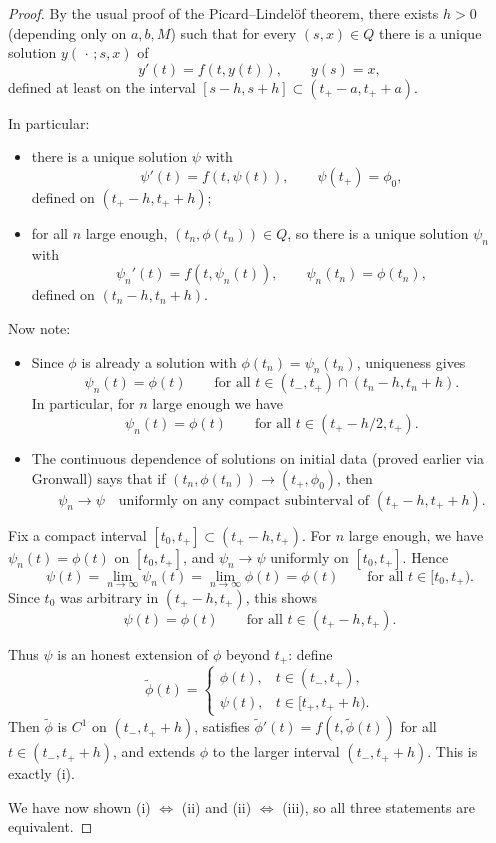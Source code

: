 \documentclass{tufte-handout}
\theoremstyle{definition}
\begin{document}
\begin{proof}
	By the usual proof of the Picard–Lindelöf theorem, there exists $h>0$ (depending
	only on $a,b,M$) such that for every $(s,x) \in Q$ there is a unique solution
	$y(\,\cdot\,;s,x)$ of
	\[
		y'(t) = f(t,y(t)), \qquad y(s) = x,
	\]
	defined at least on the interval $[s-h,s+h] \subset (t_+ - a, t_+ + a)$.

	In particular:
	\begin{itemize}
		\item there is a unique solution $\psi$ with
		      \[
		      	\psi'(t) = f(t,\psi(t)), \qquad \psi(t_+) = \phi_0,
		      \]
		      defined on $(t_+ - h,t_+ + h)$;
		\item for all $n$ large enough, $(t_n,\phi(t_n)) \in Q$,
		      so there is a unique solution $\psi_n$ with
		      \[
		      	\psi_n'(t) = f(t,\psi_n(t)), \qquad \psi_n(t_n) = \phi(t_n),
		      \]
		      defined on $(t_n - h,t_n + h)$.
	\end{itemize}

	Now note:
	\begin{itemize}
		\item Since $\phi$ is already a solution with $\phi(t_n) = \psi_n(t_n)$,
		      uniqueness gives
		      \[
		      	\psi_n(t) = \phi(t)
		      	\qquad\text{for all } t \in (t_-,t_+) \cap (t_n - h,t_n + h).
		      \]
		      In particular, for $n$ large enough we have
		      \[
		      	\psi_n(t) = \phi(t)
		      	\qquad\text{for all } t \in (t_+ - h/2, t_+).
		      \]
		\item The continuous dependence of solutions on initial data
		      (proved earlier via Gronwall) says that if
		      $(t_n,\phi(t_n)) \to (t_+,\phi_0)$, then
		      \[
		      	\psi_n \to \psi
		      	\quad\text{uniformly on any compact subinterval of } (t_+ - h,t_+ + h).
		      \]
	\end{itemize}

	Fix a compact interval $[t_0,t_+] \subset (t_+ - h,t_+)$.
	For $n$ large enough, we have $\psi_n(t) = \phi(t)$ on $[t_0,t_+]$, and
	$\psi_n \to \psi$ uniformly on $[t_0,t_+]$. Hence
	\[
		\psi(t) = \lim_{n\to\infty} \psi_n(t)
		= \lim_{n\to\infty} \phi(t)
		= \phi(t)
		\qquad\text{for all } t \in [t_0,t_+).
	\]
	Since $t_0$ was arbitrary in $(t_+ - h,t_+)$, this shows
	\[
		\psi(t) = \phi(t)
		\qquad\text{for all } t \in (t_+ - h,t_+).
	\]

	Thus $\psi$ is an honest extension of $\phi$ beyond $t_+$:
	define
	\[
		\widetilde\phi(t) =
		\begin{cases}
			\phi(t), & t \in (t_-,t_+), \\
			\psi(t), & t \in [t_+, t_+ + h).
		\end{cases}
	\]
	Then $\widetilde\phi$ is $C^1$ on $(t_-,t_+ + h)$, satisfies
	$\widetilde\phi'(t) = f(t,\widetilde\phi(t))$ for all
	$t \in (t_-,t_+ + h)$, and extends $\phi$ to the larger interval
	$(t_-,t_+ + h)$.
	This is exactly (i).

	\medskip

	We have now shown (i) $\Leftrightarrow$ (ii) and (ii) $\Leftrightarrow$ (iii),
	so all three statements are equivalent.
\end{proof}
\end{document}
